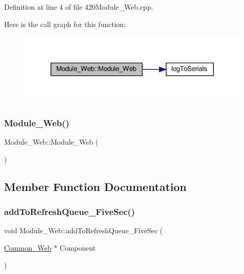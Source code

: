 Definition at line 4 of file 420\+Module\+\_\+\+Web.\+cpp.

Here is the call graph for this function\+:
\nopagebreak
\begin{figure}[H]
\begin{center}
\leavevmode
\includegraphics[width=324pt]{class_module___web_ac0b37fdb18188955c71b17767cfe1b29_cgraph}
\end{center}
\end{figure}
\mbox{\label{class_module___web_ac0b37fdb18188955c71b17767cfe1b29}} 
\subsubsection{\texorpdfstring{Module\+\_\+\+Web()}{Module\_Web()}\hspace{0.1cm}{\footnotesize\ttfamily [2/2]}}
{\footnotesize\ttfamily Module\+\_\+\+Web\+::\+Module\+\_\+\+Web (\begin{DoxyParamCaption}{ }\end{DoxyParamCaption})}



\subsection{Member Function Documentation}
\mbox{\label{class_module___web_a38624eecf0efaefb9210a60868327020}} 
\subsubsection{\texorpdfstring{add\+To\+Refresh\+Queue\+\_\+\+Five\+Sec()}{addToRefreshQueue\_FiveSec()}\hspace{0.1cm}{\footnotesize\ttfamily [1/2]}}
{\footnotesize\ttfamily void Module\+\_\+\+Web\+::add\+To\+Refresh\+Queue\+\_\+\+Five\+Sec (\begin{DoxyParamCaption}\item[{\hyperlink{class_common___web}{Common\+\_\+\+Web} $\ast$}]{Component }\end{DoxyParamCaption})}



